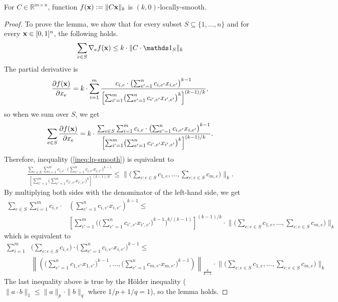 \begin{lemma} \label{lem-makespan}
For $C \in \mathbb{R}^{m \times n}$, function $f(\mathbf{x}) := \|C \mathbf{x}\|_{k}$ is $(k,0)$-locally-smooth.
\end{lemma}
%
\begin{proof}
To prove the lemma, we show that for every subset $S \subseteq \{1, \ldots, n\}$ and for every $\mathbf{x} \in [0,1]^{n}$, the following holds.
%
\begin{align}	\label{ineq:lp-smooth}
\sum_{e \in S} \nabla_{e} f(\vect{x}) \leq  k \cdot \|C \cdot \one_{S}\|_{k}
\end{align}
%
The partial derivative is
%
\begin{align*}
\frac{\partial f(\mathbf{x})}{\partial x_{e}}
= k \cdot \sum_{i = 1}^{m} \frac{c_{i,e} \cdot \bigl( \sum_{e' = 1}^{n} c_{i,e'} x_{i,e'} \bigr)^{k-1} }{ \left[ \sum_{i' = 1}^{m}
		\bigl( \sum_{e'= 1}^{n} c_{i',e'} x_{i',e'} \bigr)^{k} \right]^{(k-1)/k}},
\end{align*}
so when we sum over $S$, we get
\begin{align*}
\sum_{e \in S} \frac{\partial f(\mathbf{x})}{\partial x_{e}}
= k \cdot \frac{ \sum_{e \in S} \sum_{i = 1}^{m} c_{i,e} \cdot \bigl( \sum_{e' = 1}^{n} c_{i,e'} x_{i,e'} \bigr)^{k-1} }{ \left[ \sum_{i' = 1}^{m} \bigl( \sum_{e'= 1}^{n} c_{i',e'} x_{i',e'} \bigr)^{k} \right]^{(k-1)/k}}.
\end{align*}
%
Therefore, inequality (\ref{ineq:lp-smooth}) is equivalent to
\begin{align*}
\frac{ \sum_{e \in S} \sum_{i = 1}^{m} c_{i,e} \cdot \bigl( \sum_{e' = 1}^{n} c_{i,e'} x_{i,e'} \bigr)^{k-1} }{ \left[ \sum_{i' = 1}^{m} \bigl( \sum_{e'= 1}^{n} c_{i',e'} x_{i',e'} \bigr)^{k} \right]^{(k-1)/k}}
	\leq   \biggl \| \biggl( \sum_{e: e \in S} c_{1,e}, \ldots , \sum_{e: e \in S} c_{m,e}  \biggr) \biggr \|_{k}.
\end{align*}
%
By multiplying both sides with the denominator of the left-hand side, we get
%
\begin{align*}
    \sum_{e \in S} \sum_{i = 1}^{m} c_{i,e} \cdot & \left( \sum_{e' = 1}^{n} c_{i,e'} x_{i,e'} \right)^{k-1} \leq \\
    & \left[ \sum_{i'=1}^{m} \biggl( \biggl( \sum_{e'= 1}^{n} c_{i',e'} x_{i',e'} \biggr)^{k-1} \biggr)^{k/(k-1)} \right]^{(k-1)/k} 
    	\cdot \biggl \| \biggl( \sum_{e: e \in S} c_{1,e}, \ldots , \sum_{e: e \in S} c_{m,e}  \biggr) \biggr \|_{k}
\end{align*}
which is equivalent to
\begin{align*}
    \sum_{i=1}^{m} & \biggl( \sum_{e: e \in S} c_{i,e} \biggr) \cdot \biggl( \sum_{e'=1}^{n} c_{i,e'} x_{i,e'} \biggr)^{k-1} \leq \\
    & \left \| \left ( \biggl( \sum_{e'=1}^{n} c_{1,e'} x_{1,e'} \biggr)^{k-1}, \ldots, \biggl( \sum_{e'=1}^{n} c_{m,e'} x_{m,e'} \biggr)^{k-1} \right) \right \|_{\frac{k}{k-1}} 
    		\cdot \biggl \| \biggl( \sum_{e: e \in S} c_{1,e}, \ldots , \sum_{e: e \in S} c_{m,e}  \biggr) \biggr \|_{k}
\end{align*}
The last inequality above is true by the H\"older inequality ($\| a \cdot b\|_{1} \leq \| a \|_{p} \cdot \| b \|_{q}$ where $1/p + 1/q = 1$), so the lemma holds.
\end{proof}

